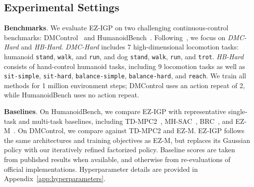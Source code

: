 

\subsection{Experimental Settings}

\textbf{Benchmarks}. 
We evaluate EZ-IGP on two challenging continuous-control benchmarks: DMControl~\citep{tassa2018deepmind} and HumanoidBench~\citep{sferrazza2024humanoidbench}. Following~\citep{nauman2025bigger,liu2026scaling}, we focus on \textit{DMC-Hard} and \textit{HB-Hard}. \textit{DMC-Hard} includes 7 high-dimensional locomotion tasks: humanoid \texttt{stand}, \texttt{walk}, and \texttt{run}, and dog \texttt{stand}, \texttt{walk}, \texttt{run}, and \texttt{trot}. \textit{HB-Hard} consists of hand-control humanoid tasks, including 9 locomotion tasks as well as \texttt{sit-simple}, \texttt{sit-hard}, \texttt{balance-simple}, \texttt{balance-hard}, and \texttt{reach}. We train all methods for 1 million environment steps; DMControl uses an action repeat of 2, while HumanoidBench uses no action repeat.

\textbf{Baselines}. 
On HumanoidBench, we compare EZ-IGP with representative single-task and multi-task baselines, including TD-MPC2~\citep{hansen2023td}, MH-SAC~\citep{yang2020multi}, BRC~\citep{nauman2025bigger}, and EZ-M~\citep{liu2026scaling}. On DMControl, we compare against TD-MPC2 and EZ-M. EZ-IGP follows the same architectures and training objectives as EZ-M, but replaces its Gaussian policy with our iteratively refined factorized policy. Baseline scores are taken from published results when available, and otherwise from re-evaluations of official implementations. Hyperparameter details are provided in Appendix~\ref{app:hyperparameters}.

